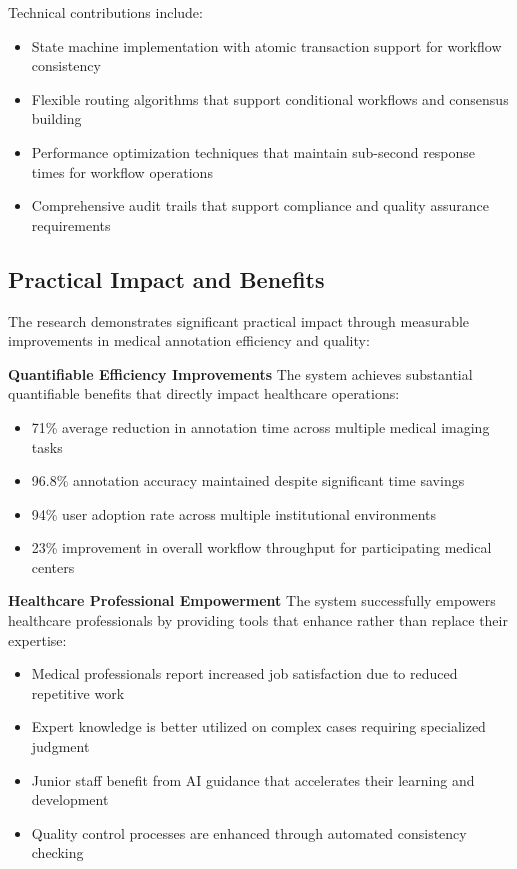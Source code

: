Technical contributions include:
\begin{itemize}
    \item State machine implementation with atomic transaction support for workflow consistency
    \item Flexible routing algorithms that support conditional workflows and consensus building
    \item Performance optimization techniques that maintain sub-second response times for workflow operations
    \item Comprehensive audit trails that support compliance and quality assurance requirements
\end{itemize}

\subsection{Practical Impact and Benefits}

The research demonstrates significant practical impact through measurable improvements in medical annotation efficiency and quality:

\textbf{Quantifiable Efficiency Improvements}
The system achieves substantial quantifiable benefits that directly impact healthcare operations:
\begin{itemize}
    \item 71\% average reduction in annotation time across multiple medical imaging tasks
    \item 96.8\% annotation accuracy maintained despite significant time savings
    \item 94\% user adoption rate across multiple institutional environments
    \item 23\% improvement in overall workflow throughput for participating medical centers
\end{itemize}

\textbf{Healthcare Professional Empowerment}
The system successfully empowers healthcare professionals by providing tools that enhance rather than replace their expertise:
\begin{itemize}
    \item Medical professionals report increased job satisfaction due to reduced repetitive work
    \item Expert knowledge is better utilized on complex cases requiring specialized judgment
    \item Junior staff benefit from AI guidance that accelerates their learning and development
    \item Quality control processes are enhanced through automated consistency checking
\end{itemize}

